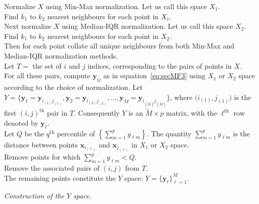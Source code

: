 \documentclass[a4paper,11pt]{article}
\begin{document}
\DontPrintSemicolon
\begin{algorithm}\fontsize{9}{10}\selectfont
	Normalize $X$ using Min-Max normalization. Let us call this space $X_1$. \\
	Find $k_1$ to $k_2$ nearest neighbours for each point in $X_1$. \\
	Next normalize $X$ using Median-IQR normalization. Let us call this space $X_2$. \\
	Find $k_1$ to $k_2$ nearest neighbours for each point in $X_2$. \\
	Then for each point collate all unique neighbours from both Min-Max and Median-IQR normalization methods. \\
	Let $T = $ the set of $i$ and $j$ indices, corresponding to the pairs of points in $X$. \\
	For all these pairs, compute $\bm{y}_{ij}$ as in equation~\eqref{eq:secMF3} using $X_1$ or $X_2$ space according to the choice of normalization. Let $Y =\big\{ \bm{y}_{1} =\bm{y}_{i_{(1)}j_{(1)}} , \bm{y}_{2} =\bm{y}_{i_{(2)}j_{(2)}}, \dots, \bm{y}_{\tilde{M}} =\bm{y}_{i_{(\tilde{M})}j_{(\tilde{M})}} \big\}$, where $\big( i_{(1)},j_{(1)} \big)$ is the first $(i, j)^{\text{th}}$ pair in $T$. Consequently $Y$ is an $\tilde{M}\times p$ matrix, with the $\ell^{\text{th}}$ row denoted by $\bm{y}_\ell$.\\
	Let $Q$ be the $q^{\text{th}}$ percentile of $ \left\{\sum_{m=1}^p {y}_{\ell m}\right\}$. The quantity $\sum_{m=1}^p {y}_{\ell m}$ is the distance between points $\bm{x}_{i_{(\ell)}}$ and $\bm{x}_{j_{(\ell)}}$ in $X_1$ or $X_2$ space. \\
	Remove points for which $ \sum_{m=1}^p {y}_{\ell m} < Q $. \\
	Remove the associated pairs of $(i, j)$ from $T$. \\
	The remaining points constitute the $Y$ space: $Y = \{\bm{y}_\ell \}_{\ell=1}^M$.
	\caption{\itshape Construction of the $Y$ space.}
	\label{algo:YSpace}
\end{algorithm}
\end{document}

